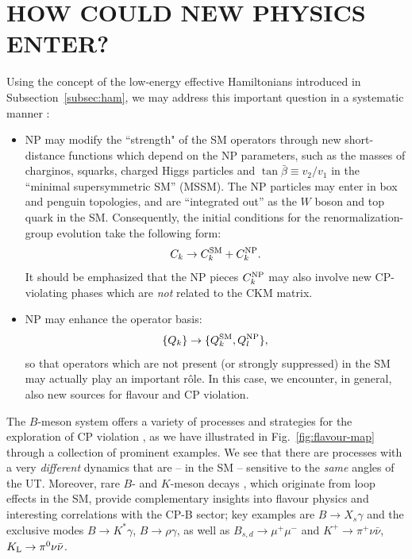 \documentclass[12pt]{article}
\begin{document}
\section{HOW COULD NEW PHYSICS ENTER?}\label{sec:NP}
\setcounter{equation}{0}
%
%
%
Using the concept of the low-energy effective Hamiltonians introduced
in Subsection~\ref{subsec:ham}, we may address this important question
in a systematic manner \cite{buras-NP}:
\begin{itemize}
\item NP may modify the ``strength" of the SM operators through new
short-distance functions which depend on the NP parameters, such as the masses 
of charginos, squarks, charged Higgs particles and $\tan\bar\beta\equiv v_2/v_1$ 
in the ``minimal supersymmetric SM'' (MSSM). The NP particles may enter in 
box and penguin topologies, and are ``integrated out'' as the $W$ boson and 
top quark in the SM. Consequently, the initial conditions for the
renormalization-group evolution take the following form:
\begin{equation}\label{WC-NP}
C_k \to C_k^{\rm SM} + C_k^{\rm NP}.
\end{equation}
It should be emphasized that the NP pieces $C_k^{\rm NP}$ may also involve 
new CP-violating phases which are {\it not} related to the CKM matrix.
\item NP may enhance the operator basis:
\begin{equation}
\{Q_k\} \to \{Q_k^{\rm SM}, Q_l^{\rm NP}\},
\end{equation}
so that operators which are not present (or strongly suppressed) in the 
SM may actually play an important r\^ole. In this case, we encounter, 
in general, also new sources for flavour and CP violation.
\end{itemize}
The $B$-meson system offers a variety of processes and strategies for the
exploration of CP violation \cite{CKM-book,RF-Phys-Rep}, as we have illustrated in 
Fig.~\ref{fig:flavour-map} through a collection of prominent examples. 
We see that there are processes with a very {\it different} dynamics that 
are -- in the SM -- sensitive to the {\it same} angles of the UT. 
Moreover, rare $B$- and $K$-meson decays \cite{rare}, 
which originate from loop effects in the SM, provide complementary insights 
into flavour physics and interesting correlations with the CP-B sector; key 
examples are $B\to X_s\gamma$ and the exclusive modes
$B\to K^\ast \gamma$, $B\to\rho\gamma$, as well as $B_{s,d}\to \mu^+\mu^-$ 
and $K^+\to\pi^+\nu\bar\nu$, $K_{\rm L}\to\pi^0\nu\bar\nu$. 
\end{document}
